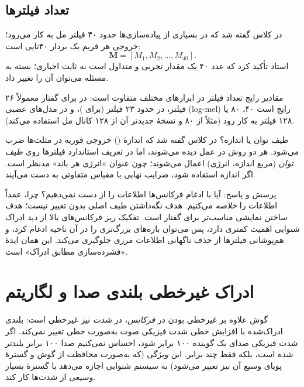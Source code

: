 \subsection{تعداد فیلترها}
در کلاس گفته شد که در بسیاری از پیاده‌سازی‌ها حدود ۴۰ فیلتر مل به کار می‌رود؛ خروجی هر فریم یک بردار ۴۰‌تایی است:
\[
\mathbf{M}=[M_1,M_2,\ldots,M_{40}].
\]
استاد تأکید کرد که عدد ۴۰ یک مقدار تجربی و متداول است نه ثابت اجباری؛ بسته به مسئله می‌توان آن را تغییر داد.

\begin{addedbox}{مقادیر رایج}
تعداد فیلتر در ابزارهای مختلف متفاوت است: در  برای گفتار  معمولاً ۲۶ فیلتر، در  حدود ۲۳ فیلتر (برای )، و در مدل‌های عصبی (log-mel) رایج است ۴۰، ۸۰ یا ۱۲۸ فیلتر به کار رود (مثلاً  از ۸۰ و نسخهٔ جدیدتر آن از ۱۲۸ کانال مل استفاده می‌کند).
\end{addedbox}

\begin{correctionbox}{طیف توان یا اندازه؟}
در کلاس گفته شد که اندازهٔ () خروجی فوریه در مثلث‌ها ضرب می‌شود. هر دو روش در عمل دیده می‌شوند، اما در تعریف استاندارد  فیلترها روی \emph{طیف توان} (مربع اندازه، انرژی) اعمال می‌شوند؛ چون عنوان «انرژی هر باند» مدنظر است. اگر اندازه استفاده شود، ضرایب نهایی با مقیاس متفاوتی به دست می‌آیند.
\end{correctionbox}

\begin{exambox}{پرسش و پاسخ: آیا با ادغام فرکانس‌ها اطلاعات را از دست نمی‌دهیم؟}
چرا، عمداً اطلاعات را \emph{خلاصه} می‌کنیم. هدف نگه‌داشتن طیف اصلی بدون تغییر نیست؛ هدف ساختن نمایشی مناسب‌تر برای گفتار است. تفکیک ریز فرکانس‌های بالا از دید ادراک شنوایی اهمیت کمتری دارد، پس می‌توان بازه‌های بزرگ‌تری را در آن ناحیه ادغام کرد، و هم‌پوشانی فیلترها از حذف ناگهانی اطلاعات مرزی جلوگیری می‌کند. این همان ایدهٔ «فشرده‌سازی مطابق ادراک» است.
\end{exambox}

\section{ادراک غیرخطی بلندی صدا و لگاریتم}

گوش علاوه بر غیرخطی بودن در \emph{فرکانس}، در \emph{شدت} نیز غیرخطی است: بلندی ادراک‌شده با افزایش خطی شدت فیزیکی صوت به‌صورت خطی تغییر نمی‌کند. اگر شدت فیزیکی صدای یک گوینده ۱۰۰ برابر شود، احساس نمی‌کنیم صدا ۱۰۰ برابر بلندتر شده است، بلکه فقط چند برابر. این ویژگی (که به‌صورت محافظت از گوش و گسترهٔ پویای وسیع آن نیز تعبیر می‌شود) به سیستم شنوایی اجازه می‌دهد با گسترهٔ بسیار وسیعی از شدت‌ها کار کند.

